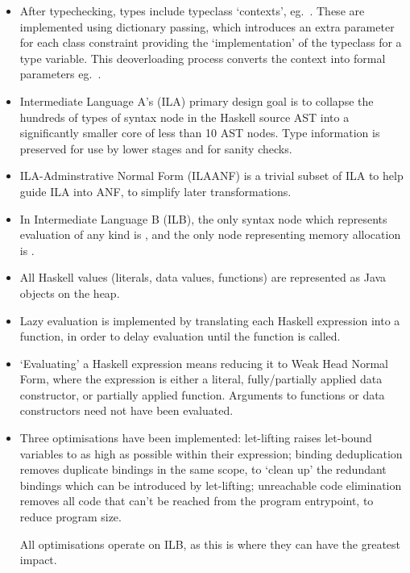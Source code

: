 \documentclass[dissertation.tex]{subfiles}
\begin{document}
{\begin{itemize}
{        Typeclasses provide a way to implement strongly-typed ad-hoc overloading, allowing for the types of overloaded expressions to be known at compile time.
    }
    \item
    {
        After typechecking, types include typeclass `contexts', eg.\ . These are implemented using dictionary passing, which introduces an extra parameter for each class constraint providing the `implementation' of the typeclass for a type variable. This deoverloading process converts the context into formal parameters eg.\ .
    }
    \item
    {
        Intermediate Language A's (ILA) primary design goal is to collapse the hundreds of types of syntax node in the Haskell source AST into a significantly smaller core of less than 10 AST nodes. Type information is preserved for use by lower stages and for sanity checks.
    }
    \item
    {
        ILA-Adminstrative Normal Form (ILAANF) is a trivial subset of ILA to help guide ILA into ANF, to simplify later transformations.
    }
    \item
    {
        In Intermediate Language B (ILB), the only syntax node which represents evaluation of any kind is , and the only node representing memory allocation is .
    }
    \item All Haskell values (literals, data values, functions) are represented as Java objects on the heap.
    \item
    {
        Lazy evaluation is implemented by translating each Haskell expression into a function, in order to delay evaluation until the function is called.
    }
    \item
    {
        `Evaluating' a Haskell expression means reducing it to Weak Head Normal Form, where the expression is either a literal, fully/partially applied data constructor, or partially applied function. Arguments to functions or data constructors need not have been evaluated.
    }
    \item
    {
        Three optimisations have been implemented: let-lifting raises let-bound variables to as high as possible within their expression; binding deduplication removes duplicate bindings in the same scope, to `clean up' the redundant bindings which can be introduced by let-lifting; unreachable code elimination removes all code that can't be reached from the program entrypoint, to reduce program size.

        All optimisations operate on ILB, as this is where they can have the greatest impact.
    }
    \end{itemize}
}
\end{document}
